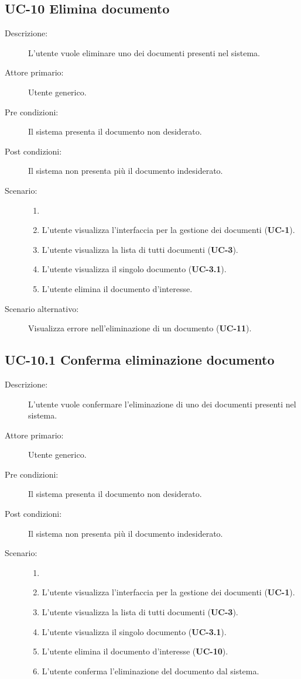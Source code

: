 \subsection{UC-10 Elimina documento}
\begin{description}
    \item[Descrizione:] L'utente vuole eliminare uno dei documenti presenti nel sistema.
    \item[Attore primario:] Utente generico.
    \item[Pre condizioni:] Il sistema presenta il documento non desiderato.
    \item[Post condizioni:] Il sistema non presenta più il documento indesiderato.
    \item[Scenario:]
    \begin{enumerate}
        \item[] 
        \item L’utente visualizza l'interfaccia per la gestione dei documenti (\textbf{UC-1}).
        \item L’utente visualizza la lista di tutti documenti (\textbf{UC-3}).
        \item L'utente visualizza il singolo documento (\textbf{UC-3.1}).
        \item L'utente elimina il documento d'interesse.
    \end{enumerate} 
    \item[Scenario alternativo:] Visualizza errore nell'eliminazione di un documento (\textbf{UC-11}).
\end{description}

\subsection{UC-10.1 Conferma eliminazione documento}
\begin{description}
    \item[Descrizione:] L'utente vuole confermare l'eliminazione di uno dei documenti presenti nel sistema.
    \item[Attore primario:] Utente generico.
    \item[Pre condizioni:] Il sistema presenta il documento non desiderato.
    \item[Post condizioni:] Il sistema non presenta più il documento indesiderato.
    \item[Scenario:] 
    \begin{enumerate}
        \item[] 
        \item L’utente visualizza l'interfaccia per la gestione dei documenti (\textbf{UC-1}).
        \item L’utente visualizza la lista di tutti documenti (\textbf{UC-3}).
        \item L'utente visualizza il singolo documento (\textbf{UC-3.1}).
        \item L'utente elimina il documento d'interesse (\textbf{UC-10}).
        \item L'utente conferma l'eliminazione del documento dal sistema.
    \end{enumerate}
    
\end{description}

